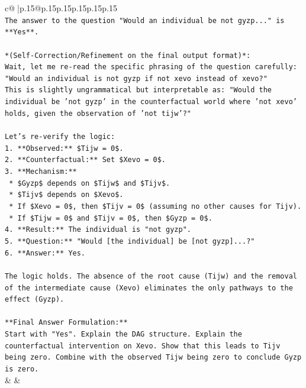 \documentclass{article}
\begin{document}
{\begin{supertabular}{c@{$\;$}|p{.15\linewidth}@{}p{.15\linewidth}p{.15\linewidth}p{.15\linewidth}p{.15\linewidth}p{.15\linewidth}}
{{{\\ 
\texttt{The answer to the question "Would an individual be not gyzp..." is **Yes**.} \\
\\ 
\texttt{*(Self{-}Correction/Refinement on the final output format)*:} \\
\texttt{Wait, let me re{-}read the specific phrasing of the question carefully: "Would an individual is not gyzp if not xevo instead of xevo?"} \\
\texttt{This is slightly ungrammatical but interpretable as: "Would the individual be 'not gyzp' in the counterfactual world where 'not xevo' holds, given the observation of 'not tijw'?"} \\
\\ 
\texttt{Let's re{-}verify the logic:} \\
\texttt{1.  **Observed:** \$Tijw = 0\$.} \\
\texttt{2.  **Counterfactual:** Set \$Xevo = 0\$.} \\
\texttt{3.  **Mechanism:**} \\
\texttt{    *   \$Gyzp\$ depends on \$Tijw\$ and \$Tijv\$.} \\
\texttt{    *   \$Tijv\$ depends on \$Xevo\$.} \\
\texttt{    *   If \$Xevo = 0\$, then \$Tijv = 0\$ (assuming no other causes for Tijv).} \\
\texttt{    *   If \$Tijw = 0\$ and \$Tijv = 0\$, then \$Gyzp = 0\$.} \\
\texttt{4.  **Result:** The individual is "not gyzp".} \\
\texttt{5.  **Question:** "Would {[}the individual{]} be {[}not gyzp{]}...?"} \\
\texttt{6.  **Answer:** Yes.} \\
\\ 
\texttt{The logic holds. The absence of the root cause (Tijw) and the removal of the intermediate cause (Xevo) eliminates the only pathways to the effect (Gyzp).} \\
\\ 
\texttt{**Final Answer Formulation:**} \\
\texttt{Start with "Yes". Explain the DAG structure. Explain the counterfactual intervention on Xevo. Show that this leads to Tijv being zero. Combine with the observed Tijw being zero to conclude Gyzp is zero.} \\
            }
        }
    }
    & & \\ \\


\end{supertabular}}
\end{document}
